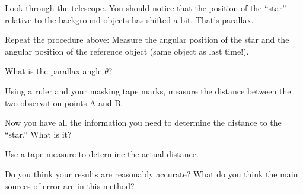 Look through the telescope.  You should notice that the position
of the ``star'' relative to the background objects has shifted
a bit.  That's parallax.

Repeat the procedure above: Measure the angular position of the
star and the angular position of the reference object (same object
as last time!).  
\answerspace{1.8in}

\pagebreak[3]
What is the parallax angle $\theta$?

\answerspace{1in}

Using a ruler and your masking tape marks, measure the distance between
the two observation points A and B.

\answerspace{1in}

Now you have all the information you need to determine the distance to
the ``star.''  What is it?

\answerspace{1in}

Use a tape measure to determine the actual distance.

\answerspace{1in}

Do you think your results are reasonably accurate?  What
do you think the main sources of error are in this method?






